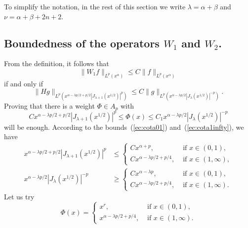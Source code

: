 \documentclass[reqno]{amsart}
\theoremstyle{plain}
\theoremstyle{definition}
\theoremstyle{remark}
\newcommand{\lpnorm}[3]{\|{#1}\|_{L^{#2}({#3})}} %
\begin{document}
To simplify the notation, in the rest of this section we write
$\lambda=\alpha+\beta$ and $\nu=\alpha+\beta+2n+2$.


\subsection{Boundedness of the operators $W_1$ and $W_2$.}

{}From the definition, it follows that
\begin{equation*}
   \lpnorm{W_1f}p{x^\alpha} \le C \lpnorm{f}p{x^\alpha}
\end{equation*}
if and only if
\begin{equation*}
   \lpnorm{Hg}p{x^{\alpha - \lambda p/2 + p/2} |J_{\lambda+1}(x^{1/2})|^p}
   \le C \lpnorm{g}p{x^{\alpha - \lambda p/2} |J_\lambda(x^{1/2})|^{-p}}.
\end{equation*}
Proving that there is a weight $\Phi \in A_p$ with
\begin{equation}
\label{ec:cotaPhi}
   C x^{\alpha - \lambda p/2 + p/2} |J_{\lambda+1}(x^{1/2})|^p
   \le \Phi(x) \le
   C_1 x^{\alpha - \lambda p/2} |J_\lambda(x^{1/2})|^{-p}
\end{equation}
will be enough. According to the bounds~(\ref{ec:cota01})
and~(\ref{ec:cota1infty}), we have
\begin{align*}
   x^{\alpha - \lambda p/2 + p/2} |J_{\lambda+1}(x^{1/2})|^p
   &\le
   \begin{cases}
   C x^{\alpha + p}, &{\text{ if }} x \in (0,1), \\
   C x^{\alpha - \lambda p/2 + p/4}, &{\text{ if }} x \in (1,\infty),
   \end{cases}   
   \\
   x^{\alpha - \lambda p/2} |J_\lambda(x^{1/2})|^{-p}
   &\ge
   \begin{cases}
   C x^{\alpha - \lambda p}, &{\text{ if }} x \in (0,1), \\
   C x^{\alpha - \lambda p/2 + p/4}, &{\text{ if }} x \in (1,\infty).
   \end{cases}
\end{align*}
Let us try
\begin{equation*}
   \Phi(x) = \begin{cases}
   x^r, &{\text{ if }} x \in (0,1), \\
   x^{\alpha - \lambda p/2 + p/4},
   &{\text{ if }} x \in (1,\infty).
   \end{cases}
\end{equation*}
\end{document}
